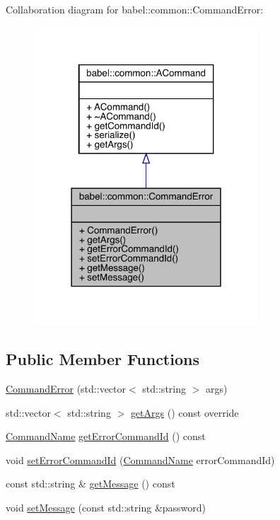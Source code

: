 Collaboration diagram for babel\+:\+:common\+:\+:Command\+Error\+:\nopagebreak
\begin{figure}[H]
\begin{center}
\leavevmode
\includegraphics[width=238pt]{classbabel_1_1common_1_1_command_error__coll__graph}
\end{center}
\end{figure}
\subsection*{Public Member Functions}
\begin{DoxyCompactItemize}
\item 
\mbox{\hyperlink{classbabel_1_1common_1_1_command_error_a536f3b4e7ccf1a435c8b253a93955d35}{Command\+Error}} (std\+::vector$<$ std\+::string $>$ args)
\item 
std\+::vector$<$ std\+::string $>$ \mbox{\hyperlink{classbabel_1_1common_1_1_command_error_af93f8813d74db60501ee4d079e983218}{get\+Args}} () const override
\item 
\mbox{\hyperlink{namespacebabel_1_1common_a2d31f246c776da6bf656bd71e86cbb2c}{Command\+Name}} \mbox{\hyperlink{classbabel_1_1common_1_1_command_error_a1bb16d3ed70b4d03a410717edbc3de47}{get\+Error\+Command\+Id}} () const
\item 
void \mbox{\hyperlink{classbabel_1_1common_1_1_command_error_a1b0028d5c5cb3ee418512e31c25862e6}{set\+Error\+Command\+Id}} (\mbox{\hyperlink{namespacebabel_1_1common_a2d31f246c776da6bf656bd71e86cbb2c}{Command\+Name}} error\+Command\+Id)
\item 
const std\+::string \& \mbox{\hyperlink{classbabel_1_1common_1_1_command_error_adc342d2a305351da510276ef01edd9cc}{get\+Message}} () const
\item 
void \mbox{\hyperlink{classbabel_1_1common_1_1_command_error_af949fce1cea9f29aecdfa941df8bcdaa}{set\+Message}} (const std\+::string \&password)
\end{DoxyCompactItemize}


